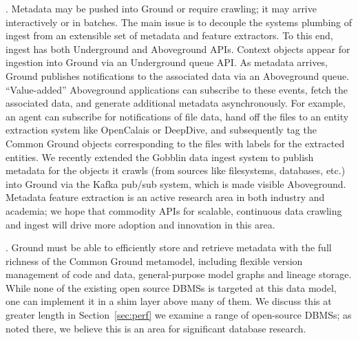\documentclass{sig-alternate}
\begin{document}
.  Metadata may be pushed into Ground or require crawling; it may arrive interactively or in batches. 
The main issue is to decouple the systems plumbing of ingest from an extensible set of metadata and feature extractors.
To this end, ingest has both Underground and Aboveground APIs.
Context objects appear for ingestion into Ground via an Underground queue API. 
As metadata arrives, Ground publishes notifications to the associated data via an Aboveground queue. ``Value-added'' Aboveground applications can subscribe to these events, fetch the associated data, and generate additional metadata asynchronously. 
For example, an agent can subscribe for notifications of file data, hand off the files to an entity extraction system like OpenCalais or DeepDive, and subsequently tag the Common Ground objects corresponding to the files with labels for the extracted entities.
We recently extended the Gobblin data ingest system to publish metadata for the objects it crawls (from 
sources like filesystems, databases, etc.) into Ground via the Kafka pub/sub system, which is made visible Aboveground. 
Metadata feature extraction is an active research area in both industry and academia; we hope that commodity APIs for scalable, continuous data crawling and ingest will drive more adoption and innovation in this area. 

.  Ground must be able to efficiently store and retrieve metadata with the full richness of the Common Ground metamodel, including flexible version management of code and data, general-purpose model graphs and lineage storage. 
While none of the existing open source DBMSs is targeted at this data model, one can implement it in a shim layer above many of them. We discuss this at greater length in Section~\ref{sec:perf} we examine a range of open-source DBMSs; as noted there, we believe this is an area for significant database research.
\end{document}
